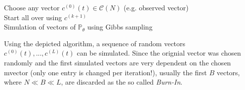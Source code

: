 \documentclass[headsepline=true, abstracton]{scrartcl}
\begin{document}
\begin{algorithm}[H]
 Choose any vector $c^{(0)}(t) \in \mathcal{C}(N)$ (e.g. observed vector)\\
 Start all over using $c^{(k+1)}$\\[0.3cm]
 \caption{Simulation of vectors of $\mathbb{P}_\theta$ using Gibbs sampling}
\end{algorithm}
\vspace{0.5cm}
\noindent Using the depicted algorithm, a sequence of random vectors $c^{(0)}(t),...,c^{(L)}(t)$ can be simulated. Since the orignial vector was chosen randomly and the first simulated vectors are very dependent on the chosen mvector (only one entry is changed per iteration!), usually the first $B$ vectors, where $N \ll B \ll L$, are discarded as the so called \textit{Burn-In}.
\end{document}
